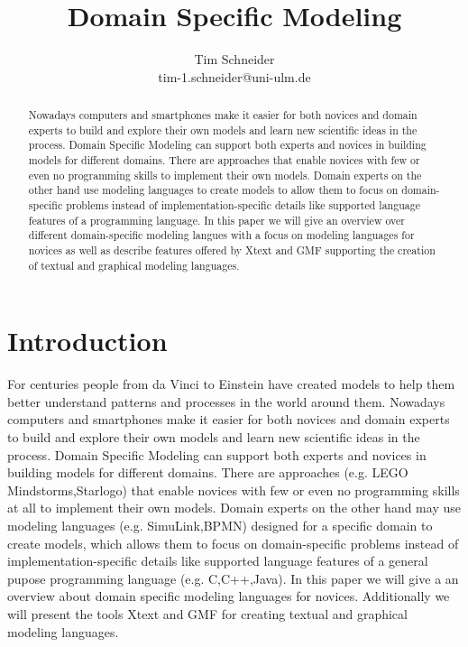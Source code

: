 \documentclass[runningheads,a4paper]{llncs}
\begin{document}
\mainmatter  %

\title{Domain Specific Modeling}



\author{Tim Schneider\\ tim-1.schneider@uni-ulm.de}


\maketitle


\begin{abstract}
Nowadays computers and smartphones make it easier for both novices and domain experts to build 
and explore their own models and learn new scientific ideas in the process.
Domain Specific Modeling can support both experts and novices in building models for different domains.
There are approaches that enable novices with few or even no programming skills to implement their own models.
Domain experts on the other hand use modeling languages to create models to 
allow them to focus on domain-specific problems instead of implementation-specific details like supported 
language features of a programming language. 
In this paper we will give an overview over different domain-specific modeling langues with a focus on modeling languages for novices
as well as describe features offered by Xtext and GMF supporting the creation of textual and graphical modeling languages.
\end{abstract}

\section{Introduction}
\label{sec:introduction}
For centuries people from da Vinci to Einstein have created models to help them better 
understand patterns and processes in the world around them. 
Nowadays computers and smartphones make it easier for both novices and domain experts to build 
and explore their own models and learn new scientific ideas in the process.
Domain Specific Modeling can support both experts and novices in building models for different domains.
There are approaches (e.g. LEGO Mindstorms,Starlogo) that enable novices with few or even no programming 
skills at all to implement their own models.
Domain experts on the other hand may use modeling languages (e.g. SimuLink,BPMN) designed for a specific domain to create models, 
which allows them to focus on domain-specific problems instead of implementation-specific details like supported 
language features of a general pupose programming language (e.g. C,C++,Java).
In this paper we will give a an overview about domain specific modeling languages for novices.
Additionally we will present the tools Xtext and GMF for creating textual and graphical modeling languages. 
\end{document}
